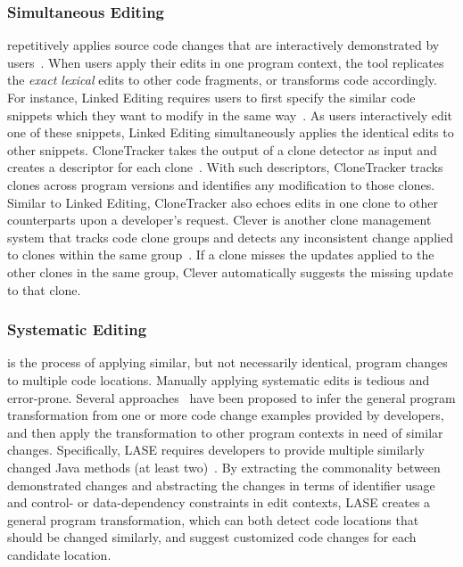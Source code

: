 \documentclass[runningheads,a4paper]{llncs}
\begin{document}
\subsubsection{Simultaneous Editing} repetitively applies source code changes that are interactively demonstrated by users~\cite{MiM2001}. When users apply their edits in one program context, the tool replicates the \emph{exact lexical} edits to other code fragments, or transforms code accordingly. For instance, Linked Editing requires users to first specify the similar code snippets which they want to modify in the same way~\cite{TBG2004}. As users interactively edit one of these snippets, Linked Editing simultaneously applies the identical edits to other snippets. 
CloneTracker takes the output of a clone detector as input and creates a descriptor for each clone~\cite{DuR2007}. With such descriptors, CloneTracker tracks clones across program versions and identifies any modification to those clones. 
Similar to Linked Editing, CloneTracker also echoes edits in one clone to other counterparts upon a developer's request. 
Clever is another clone management system that tracks code clone groups and detects any inconsistent change applied to clones within the same group~\cite{NNP2009}. If a clone misses the updates applied to the other clones in the same group, Clever automatically suggests the missing update to that clone.

\subsubsection{Systematic Editing} is the process of applying similar, but not necessarily identical, program changes to multiple code locations. 
Manually applying systematic edits is tedious and error-prone. 
Several approaches~\cite{MKM2011,MKM2013,Rolim:2017} have been proposed to infer the general program transformation from one or more code change examples provided by developers, and then apply the transformation to other program contexts in need of similar changes. Specifically, LASE requires developers to provide multiple similarly changed Java methods (at least two)~\cite{MKM2013}. By extracting the commonality between demonstrated changes and abstracting the changes in terms of identifier usage and control- or data-dependency constraints in edit contexts, LASE creates a general program transformation, which can both detect code locations that should be changed similarly, and suggest customized code changes for each candidate location.
\end{document}
